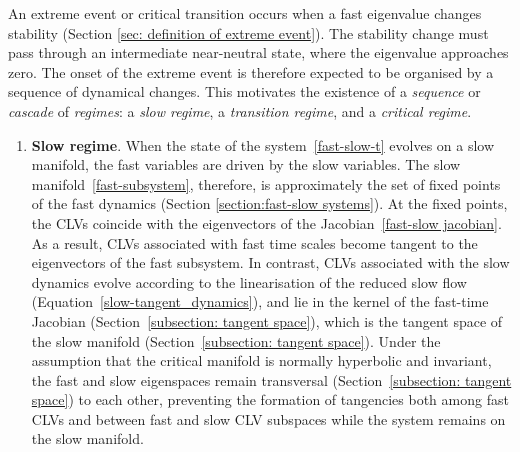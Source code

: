\documentclass[aps,reprint,prx]{revtex4-2}
\begin{document}
{An extreme event or critical transition occurs when a fast eigenvalue changes stability (Section \ref{sec: definition of extreme event}). The stability change must pass through an intermediate near-neutral state, where the eigenvalue approaches zero. The onset of the extreme event is therefore expected to be organised by a sequence of dynamical changes. This motivates the existence of a \textit{sequence} or \textit{cascade} of \textit{regimes}: a \textit{slow regime}, a \textit{transition regime}, and a \textit{critical regime}.} 

\begin{enumerate}
\item {\textbf{Slow regime}}. When the state of the system~\eqref{fast-slow-t} evolves on a slow manifold, the fast variables are {driven by} the slow variables. The slow manifold~\eqref{fast-subsystem}, therefore, {is} approximately the set of fixed points of the fast dynamics (Section \ref{section:fast-slow systems}). At the fixed points, the CLVs coincide with the eigenvectors of the Jacobian~\eqref{fast-slow jacobian}. As a result, CLVs associated with fast time scales become tangent to the eigenvectors of the fast subsystem. In contrast, CLVs associated with the slow dynamics evolve according to the linearisation of the reduced slow flow (Equation~\eqref{slow-tangent_dynamics}), and lie in the kernel of the fast-time Jacobian (Section~\ref{subsection: tangent space}), which is the tangent space of the slow manifold (Section~\ref{subsection: tangent space}). Under the assumption that the critical manifold is normally hyperbolic and invariant, the fast and slow eigenspaces remain transversal (Section~\ref{subsection: tangent space}) {to each other}, preventing the formation of tangencies both among fast CLVs and between fast and slow CLV subspaces while the system remains on the slow manifold.


\end{enumerate}
\end{document}
